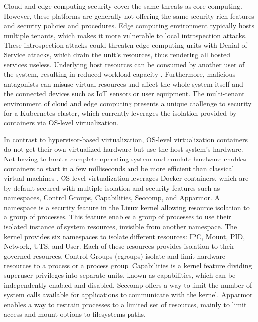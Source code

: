 Cloud and edge computing security cover the same threats as core computing. However, these platforms are generally not offering the same security-rich features and security policies and procedures. Edge computing environment typically hosts multiple tenants, which makes it more vulnerable to local introspection attacks. These introspection attacks could threaten edge computing units with Denial-of-Service attacks, which drain the unit's resources, thus rendering all hosted services useless. Underlying host resources can be consumed by another user of the system, resulting in reduced workload capacity \cite{Edwards2019}. Furthermore, malicious antagonists can misuse virtual resources and affect the whole system itself and the connected devices such as IoT sensors or user equipment. The multi-tenant environment of cloud and edge computing presents a unique challenge to security for a Kubernetes cluster, which currently leverages the isolation provided by containers via OS-level virtualization. \cite{EdgeComputing5G}\cite{Abbas2018}

In contrast to hypervisor-based virtualization, OS-level virtualization containers do not get their own virtualized hardware but use the host system's hardware. Not having to boot a complete operating system and emulate hardware enables containers to start in a few milliseconds and be more efficient than classical virtual machines \cite{Eder2016}. OS-level virtualization leverages Docker containers, which are by default secured with multiple isolation and security features such as namespaces, Control Groups, Capabilities, Seccomp, and Apparmor. A namespace is a security feature in the Linux kernel allowing resource isolation to a group of processes. This feature enables a group of processes to use their isolated instance of system resources, invisible from another namespace. The kernel provides six namespaces to isolate different resources: IPC, Mount, PID, Network, UTS, and User. Each of these resources provides isolation to their governed resources. Control Groups (cgroups) isolate and limit hardware resources to a process or a process group. Capabilities is a kernel feature dividing superuser privileges into separate units, known as capabilities, which can be independently enabled and disabled. Seccomp offers a way to limit the number of system calls available for applications to communicate with the kernel. Apparmor enables a way to restrain processes to a limited set of resources, mainly to limit access and mount options to filesystems paths. \cite{Flauzac2020}\cite{Gao2017}

